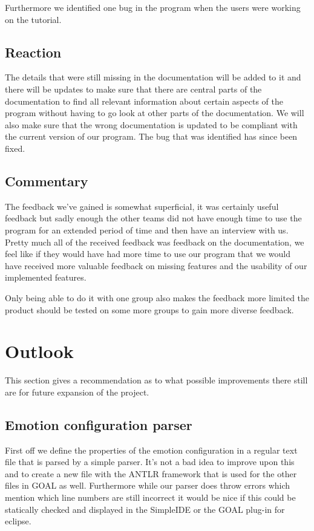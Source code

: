 \documentclass[]{article}
\begin{document}
Furthermore we identified one bug in the program when the users were working on the tutorial. 
\subsection{Reaction}
The details that were still missing in the documentation will be added to it and there will be updates to make sure that there are central parts of the documentation to find all relevant information about certain aspects of the program without having to go look at other parts of the documentation. We will also make sure that the wrong documentation is updated to be compliant with the current version of our program. The bug that was identified has since been fixed.

\subsection{Commentary}
The feedback we've gained is somewhat superficial, it was certainly useful feedback but sadly enough the other teams did not have enough time to use the program for an extended period of time and then have an interview with us. Pretty much all of the received feedback was feedback on the documentation, we feel like if they would have had more time to use our program that we would have received more valuable feedback on missing features and the usability of our implemented features.

Only being able to do it with one group also makes the feedback more limited the product should be tested on some more groups to gain more diverse feedback.

\section{Outlook}
This section gives a recommendation as to what possible improvements there still are for future expansion of the project.

\subsection{Emotion configuration parser}
First off we define the properties of the emotion configuration in a regular text file that is parsed by a simple parser. It's not a bad idea to improve upon this and to create a new file with the ANTLR framework that is used for the other files in GOAL as well. Furthermore while our parser does throw errors which mention which line numbers are still incorrect it would be nice if this could be statically checked and displayed in the SimpleIDE or the GOAL plug-in for eclipse.
\end{document}
